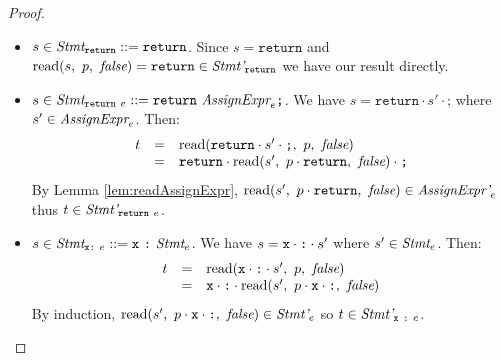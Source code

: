 \documentclass[onecolumn]{sigplanconf-onecolumn}
\begin{document}
\begin{proof}
\begin{itemize}
  \item \( s \in \textit{Stmt}_{\texttt{return}} ::= \texttt{return} \).
    Since \( s = \texttt{return} \) and \( \textrm{read}(s,~p,~\textit{false}) =
    \texttt{return} \in \textit{Stmt'}_{\texttt{return}} \) we
    have our result directly.

  \item \( s \in \textit{Stmt}_{\texttt{return}~e} ::=
    \texttt{return}~ \textit{AssignExpr}_{e} \texttt{;} \).
    We have \( s
    = \texttt{return}\cdot s' \cdot \texttt{;} \) where \( s' \in
    \textit{AssignExpr}_{e} \). Then:
    \[
    \begin{array}{rcl}
      t &=& \textrm{read}(\texttt{return} \cdot s' \cdot \texttt{;},~p,~\textit{false})
      \\
      &=& \texttt{return}\cdot \textrm{read}(s',~p \cdot \texttt{return},~\textit{false})
      \cdot \texttt{;}
    \end{array}
    \]
    By Lemma \ref{lem:readAssignExpr}, \( \textrm{read}(s',~p
      \cdot \texttt{return},~\textit{false}) \in \textit{AssignExpr'}_{e}
    \) thus \( t \in \textit{Stmt'}_{\texttt{return}~e} \).

  \item \( s \in \textit{Stmt}_{\texttt{x} \texttt{:}~e} ::=
    \texttt{x}~\texttt{:}~\textit{Stmt}_{e} \). We have \( s = \texttt{x} \cdot
    \texttt{:} \cdot s' \) where \( s' \in \textit{Stmt}_{e} \). Then:
    \[
    \begin{array}{rcl}
      t &=& \textrm{read}(\texttt{x} \cdot \texttt{:} \cdot s',~p,~\textit{false})
      \\
      &=& \texttt{x} \cdot \texttt{:} \cdot 
      \textrm{read}(s',~
        p \cdot \texttt{x} \cdot \texttt{:}
      ,~\textit{false})
    \end{array}
    \]
    By induction, \( \textrm{read}(s',~p \cdot \texttt{x} \cdot
      \texttt{:},~\textit{false}) \in \textit{Stmt'}_{e} \) so \( t \in
    \textit{Stmt'}_{\texttt{x}~\texttt{:}~e} \).
  \end{itemize}
\end{proof}
\end{document}
